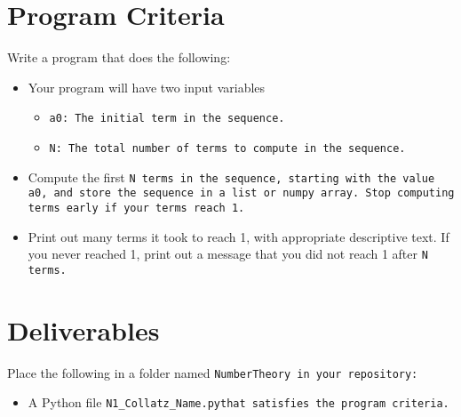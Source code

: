 \documentclass{article}
\newcommand\foldername{\tt{NumberTheory} }
\newcommand\filename{\tt{N1\_Collatz\_Name.py}\;\;}
\begin{document}
\section*{Program Criteria}
	Write a program that does the following:
	\begin{itemize}
		\item Your program will have two input variables
		\begin{itemize}
			\item \tt{a0}: The initial term in the sequence.
			\item \tt{N}: The total number of terms to compute in the sequence.
		\end{itemize}
		\item Compute the first \tt{N} terms in the sequence, starting with the value \tt{a0}, and store the sequence in a list or numpy array.  Stop computing terms early if your terms reach 1.
		\item Print out many terms it took to reach 1, with appropriate descriptive text.  If you never reached 1, print out a message that you did not reach 1 after \tt{N} terms.		
	\end{itemize}







\section*{Deliverables}
	
	
	Place the following in a folder named \foldername in your repository:
	\begin{itemize}
		\item A Python file \filename  that satisfies the program criteria.
	\end{itemize}

	
\end{document}
